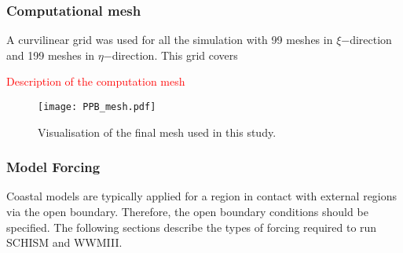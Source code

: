 \documentclass[12pt]{article}
\begin{document}
\subsubsection{Computational mesh}

A curvilinear grid was used for all the simulation with 99 meshes in $\xi$−direction and 199 meshes in $\eta$−direction. This grid covers 

\textcolor{red}{Description of the computation mesh}

\begin{figure}[h]
    \centering
    \texttt{[image: PPB\_mesh.pdf]}
    \caption{Visualisation of the final mesh used in this study.}
    \label{fig:unstructured_grid_PPB}
\end{figure}

\subsubsection {Model Forcing}

Coastal models are typically applied for a region in contact with external regions via the open boundary. Therefore, the open boundary conditions should be specified. The following sections describe the types of forcing required to run SCHISM and WWMIII.



\end{document}
